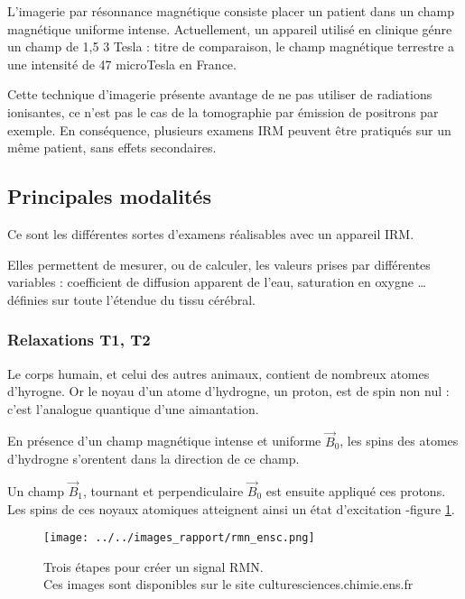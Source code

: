 L'imagerie par r\'esonnance magn\'etique consiste  placer un patient dans un champ magn\'etique uniforme intense. %
Actuellement, un appareil utilis\'e en clinique g\'enre un champ de 1,5  3 Tesla : %
 titre de comparaison, le champ magn\'etique terrestre a une intensit\'e de 47 microTesla en France.

\par
Cette technique d'imagerie pr\'esente avantage de ne pas utiliser de radiations ionisantes, %
ce n'est pas le cas de la tomographie par \'emission de positrons par exemple. %
En cons\'equence, plusieurs examens IRM peuvent \^etre pratiqu\'es sur un m\^eme patient, sans effets secondaires.

\subsection{Principales modalit\'es}

Ce sont les diff\'erentes sortes d'examens r\'ealisables avec un appareil IRM.

\par
Elles permettent de mesurer, ou de calculer, les valeurs prises par diff\'erentes variables : %
coefficient de diffusion apparent de l'eau, saturation en oxygne \dots %
d\'efinies sur toute l'\'etendue du tissu c\'er\'ebral.

\subsubsection{Relaxations T1, T2}

Le corps humain, et celui des autres animaux, contient de nombreux atomes d'hyrogne. %
Or le noyau d'un atome d'hydrogne, un proton, est de spin non nul : c'est l'analogue quantique d'une aimantation.

\par
En pr\'esence d'un champ magn\'etique intense et uniforme $\vec{B}_0$, les spins des atomes d'hydrogne s'orentent dans la direction de ce champ.

\par
Un champ $\vec{B}_1$, tournant et perpendiculaire  $\vec{B}_0$ est ensuite appliqu\'e  ces protons. %
Les spins de ces noyaux atomiques atteignent ainsi un \'etat d'excitation -figure \ref{irm_b01}.

\begin{figure}[!b]
\texttt{[image: ../../images\_rapport/rmn\_ensc.png]}
\caption{Trois \'etapes pour cr\'eer un signal RMN.
\\
Ces images sont disponibles sur le site culturesciences.chimie.ens.fr}
\label{irm_b01}
\end{figure}

